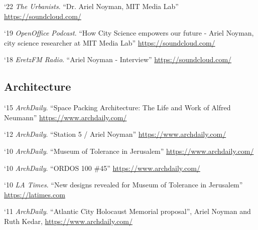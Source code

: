 \begin{tablist}
    \item[`22] \tab \textit{The Urbanists}. \enquote{Dr. Ariel Noyman, MIT Media Lab}
    \href{https://soundcloud.com/omer-raz/40a}{https://soundcloud.com/}

    \item[`19] \tab \textit{OpenOffice Podcast}. \enquote{How City Science empowers our future - Ariel Noyman, city science researcher at MIT Media Lab}
    \href{https://soundcloud.com/openofficepodcast/5-how-city-science-empowers-our-future-ariel-noyman-city-science-researcher-at-mit-media-lab}{https://soundcloud.com/}

    \item[`18] \tab \textit{EretzFM Radio}. \enquote{Ariel Noyman - Interview}
    \href{https://soundcloud.com/eretzfm/070119a-3}{https://soundcloud.com/}


    \subsection*{Architecture}
    \item[`15] \tab \textit{ArchDaily}. \enquote{Space Packing Architecture: The Life and Work of Alfred Neumann}
    \href{https://www.archdaily.com/633053/space-packing-architecture-the-life-and-work-of-alfred-neumann}{https://www.archdaily.com/}

    \item[`12] \tab \textit{ArchDaily}. \enquote{Station 5 / Ariel Noyman}
    \href{https://www.archdaily.com/117870/station-5-ariel-noyman}{https://www.archdaily.com/}

    \item[`10] \tab \textit{ArchDaily}. \enquote{Museum of Tolerance in Jerusalem}
    \href{https://www.archdaily.com/81319/museum-of-tolerance-in-jerusalem-chyutin-architects}{https://www.archdaily.com/}

    \item[`10] \tab \textit{ArchDaily}. \enquote{ORDOS 100 \#45}
    \href{https://www.archdaily.com/32535/ordos-100-45-efrat-kowalsky-architects}{https://www.archdaily.com/}

    \item[`10] \tab \textit{LA Times}. \enquote{New designs revealed for Museum of Tolerance in Jerusalem}
    \href{https://latimesblogs.latimes.com/culturemonster/2010/09/simon-wiesenthal-center-unveils-new-designs-for-museum-of-tolerance-in-jerusalem-.html}{https://latimes.com}


    \item[`11] \tab \textit{ArchDaily}. \enquote{Atlantic City Holocaust Memorial proposal}, Ariel Noyman and Ruth Kedar,
    \href{https://www.archdaily.com/92128/atlantic-city-holocaust-memorial-proposal-ariel-noyman-and-ruth-kedar}{https://www.archdaily.com/}


\end{tablist}

